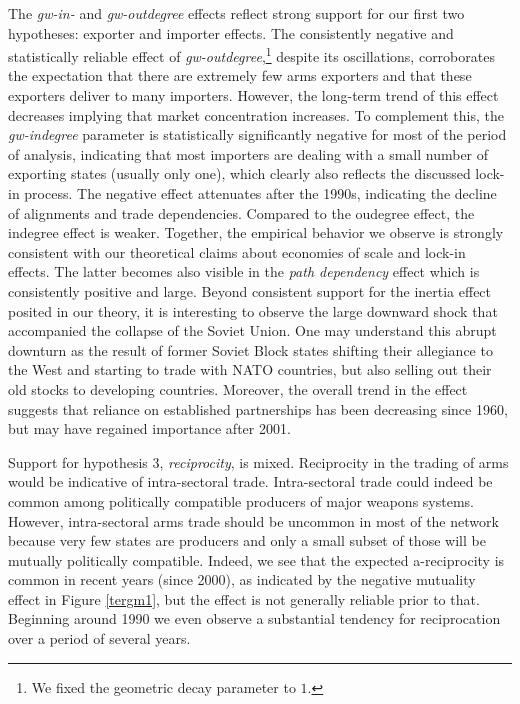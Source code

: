 \documentclass[12pt, letterpaper]{article}
\numberwithin{equation}{section}
\begin{document}
The \textit{gw-in-} and \textit{gw-outdegree} effects reflect strong support for our first two hypotheses: exporter and importer effects. 
The consistently negative and statistically reliable effect of \textit{gw-outdegree},\footnote{We fixed the geometric decay parameter to $1$.} despite its oscillations, corroborates the expectation that there are extremely few arms exporters and that these exporters deliver to many importers. However, the long-term trend of this effect decreases implying that market concentration increases. To complement this, the \textit{gw-indegree} parameter is statistically significantly negative for most of the period of analysis, indicating that most importers are dealing with a small number of exporting states (usually only one), which clearly also reflects the discussed lock-in process. The negative effect attenuates after the 1990s, indicating the decline of alignments and trade dependencies. Compared to the oudegree effect, the indegree effect is weaker. Together, the empirical behavior we observe is strongly consistent with our theoretical claims about economies of scale and lock-in effects. The latter becomes also visible in the \textit{path dependency} effect which is consistently positive and large. 
Beyond consistent support for the inertia effect posited in our theory, it is interesting to observe the large downward shock that accompanied the collapse of the Soviet Union. 
One may understand this abrupt downturn as the result of former Soviet Block states shifting their allegiance to the West and starting to trade with NATO countries, but also selling out their old stocks to developing countries. 
Moreover, the overall trend in the effect suggests that reliance on established partnerships has been decreasing since 1960, but may have regained importance after 2001.

Support for hypothesis 3, \textit{reciprocity}, is mixed.
Reciprocity in the trading of arms would be indicative of intra-sectoral trade. 
Intra-sectoral trade could indeed be common among politically compatible producers of major weapons systems. However, intra-sectoral arms trade should be uncommon in most of the network because very few states are producers and only a small subset of those will be mutually politically compatible. 
Indeed, we see that the expected a-reciprocity is common in recent years (since 2000), as indicated by the negative mutuality effect in Figure \ref{tergm1}, but the effect is not generally reliable prior to that. Beginning around 1990 we even observe a substantial tendency for reciprocation over a period of several years.  
\end{document}
